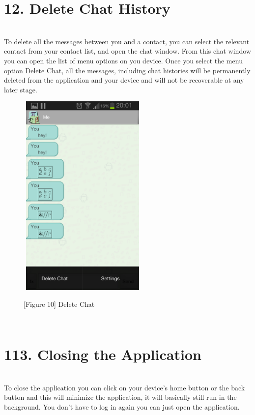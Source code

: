 \documentclass[29pt,a4paper]{moderncv}
\begin{document}
		\section*{12. Delete Chat History}
			\vspace{5mm}
			\\To delete all the messages between you and a contact, you can select the relevant contact from your contact list, and open the chat window.  From this chat window you can open the list of menu options on you device.  Once you select the menu option Delete Chat, all the messages, including chat histories will be permanently deleted from the application and your device and will not be recoverable at any later stage. \\
			\noindent\begin{figure}
							\centering
							\includegraphics[width=2.5in, height=4.0in]{./Screenshot_2013-10-23-20-01-05.png} \\
							\centering \caption{[Figure 10] Delete Chat}
							\end{figure}\\
							
			\vspace{5mm}
			
			\section*{113. Closing the Application}
				\vspace{5mm}
				\\To close the application you can click on your device's home button or the back button and this will minimize the application, it will basically still run in the background. You don't have to log in again you can just open the application.
			
				\vspace{4mm}
		
\end{document}
